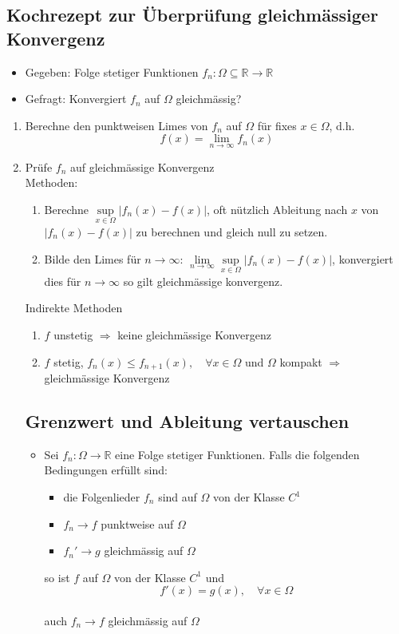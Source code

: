 \documentclass[a3paper, 11pt, landscape]{scrartcl}
\begin{document}
\begin{multicols*}{3}
	\subsection{Kochrezept zur Überprüfung gleichmässiger Konvergenz}
	\begin{itemize}
	    \item Gegeben: Folge stetiger Funktionen $f_n:\Omega \subseteq \mathbb{R}\to\mathbb{R}$
	    \item Gefragt: Konvergiert $f_n$ auf $\Omega$ gleichmässig?
	\end{itemize}
	\begin{enumerate}
	    \item Berechne den punktweisen Limes von $f_n$ auf $\Omega$ für fixes $x\in\Omega$, d.h. $$f(x) =\lim \limits_{n\to\infty} f_n(x)$$
	    \item Prüfe $f_n$ auf gleichmässige Konvergenz\\
	    Methoden:
	    \begin{enumerate}
	        \item Berechne $\sup \limits_{x\in\Omega} |f_n(x)-f(x)|$, oft nützlich Ableitung nach $x$ von $|f_n(x)-f(x)|$ zu berechnen und gleich null zu setzen.
	        \item Bilde den Limes für $n\to\infty$: $\lim\limits_{n\to\infty}\sup\limits_{x\in\Omega}|f_n(x)-f(x)|$, konvergiert dies für $n\to \infty$ so gilt gleichmässige konvergenz.
	    \end{enumerate}
	    Indirekte Methoden
	    \begin{enumerate}
	        \item $ f$ unstetig $\Rightarrow$ keine gleichmässige Konvergenz
	        \item $f$ stetig, $f_n(x)\leq f_{n+1}(x),\quad\forall x \in\Omega $ und $\Omega$ kompakt $\Rightarrow$ gleichmässige Konvergenz
	    \end{enumerate}
	
	\subsection{Grenzwert und Ableitung vertauschen}
	\begin{itemize}
	    \item Sei $f_n:\Omega \to\mathbb{R}$ eine Folge stetiger Funktionen. Falls die folgenden Bedingungen erfüllt sind:
	    \begin{itemize}
	        \item die Folgenlieder $f_n$ sind auf $\Omega$ von der Klasse $C^1$
	        \item $f_n\to f$ punktweise auf $\Omega$
	        \item $f_n'\to g$ gleichmässig auf $\Omega$
	    \end{itemize}
	    so ist $f$ auf $\Omega$ von der Klasse $C^1$ und $$f'(x)=g(x),\quad \forall x\in\Omega$$\\
	    auch $f_n\to f$ gleichmässig auf $\Omega$
	    

\end{itemize}
\end{enumerate}
\end{multicols*}
\end{document}
